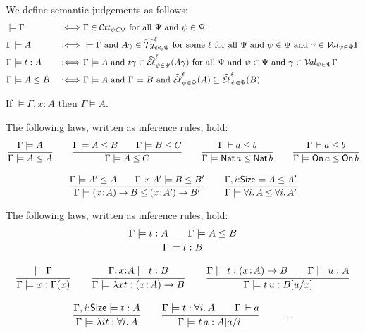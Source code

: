 \documentclass[acmsmall,screen]{acmart}\settopmatter{}
\renewcommand{\forallT}[2]{\forall #1.\,#2}
\renewcommand{\cext}[3]{#1,#2{:}#3}
\begin{document}
We define semantic judgements as follows:
\begin{align*}
  & \models \Gamma
    & \mathrel{\ :\Longleftrightarrow\ }
    & \Gamma \in \mathcal{C}\kern-0.4ex\mathit{xt}_{\psi\in\Psi} \ \mbox{for all}\  \Psi \ \mbox{and}\  \psi \in \Psi
\\
  & \Gamma \models A
    & \mathrel{\ :\Longleftrightarrow\ }
    & \models \Gamma \ \mbox{and}\ 
      A \gamma \in \widehat{\mathcal{T}\kern-0.4ex\mathit{y}}^{\ell}_{\psi\in\Psi} \ \mbox{for some}\  \ell
      \ \mbox{for all}\  \Psi \ \mbox{and}\  \psi \in \Psi
      \ \mbox{and}\  \gamma \in \mathcal{V}\kern-0.4ex\mathit{al}_{\psi\in\Psi} \Gamma
\\
  & \Gamma \models t : A
    & \mathrel{\ :\Longleftrightarrow\ }
    & \Gamma \models A \ \mbox{and}\ 
      t \gamma \in \widehat{\mathcal{E}\kern-0.2ex\ell}^{\ell}_{\psi\in\Psi}(A \gamma)
      \ \mbox{for all}\  \Psi \ \mbox{and}\  \psi \in \Psi
      \ \mbox{and}\  \gamma \in \mathcal{V}\kern-0.4ex\mathit{al}_{\psi\in\Psi} \Gamma
\\
  & \Gamma \models A \leq B
    & \mathrel{\ :\Longleftrightarrow\ }
    & \Gamma \models A \ \mbox{and}\  \Gamma \models B \ \mbox{and}\ 
      \widehat{\mathcal{E}\kern-0.2ex\ell}^{\ell}_{\psi\in\Psi}(A) \subseteq \widehat{\mathcal{E}\kern-0.2ex\ell}^{\ell}_{\psi\in\Psi}(B)
\end{align*}
\begin{lemma}
  If\/ $\models \cext \Gamma x A$ then $\Gamma \models A$.
\end{lemma}
\begin{lemma}
  The following laws, written as inference rules, hold:
\begin{gather*}
  \ru{\Gamma \models A
    }{\Gamma \models A \leq A}
\qquad
  \ru{\Gamma \models A \leq B \qquad
      \Gamma \models B \leq C
    }{\Gamma \models A \leq C}
\qquad
  \ru{\Gamma \der a \leq b
    }{\Gamma \models \Nat a \leq \Nat b}
\qquad
  \ru{\Gamma \der a \leq b
    }{\Gamma \models \On a \leq \On b}
\\[2ex]
  \ru{\Gamma \models A' \leq A \qquad
      \cext \Gamma x {A'} \models B \leq B'
    }{\Gamma \models \funT x A B \leq \funT x {A'} {B'}}
\qquad
  \ru{\cext \Gamma i \Size \models A \leq A'
    }{\Gamma \models \forallT i A \leq \forallT i {A'}}
  \end{gather*}
\end{lemma}
\begin{theorem}
  The following laws, written as inference rules, hold:
\begin{gather*}
  \ru{\Gamma \models t : A \qquad
      \Gamma \models A \leq B
    }{\Gamma \models t : B}
\\[2ex]
  \ru{\models \Gamma
    }{\Gamma \models x : \Gamma(x)}
\qquad
  \ru{\cext \Gamma x A \models t : B
    }{\Gamma \models \lambda x t : \funT x A B}
\qquad
  \ru{\Gamma \models t : \funT x A B \qquad
      \Gamma \models u : A
    }{\Gamma \models t\,u : \subst u x B}
\\[2ex]
  \ru{\cext \Gamma i \Size \models t : A
    }{\Gamma \models \lambda i t : \forallT i A}
\qquad
  \ru{\Gamma \models t : \forallT i A \qquad
      \Gamma \der a
    }{\Gamma \models t\,a : \subst a i A}
\qquad
  \dots
\end{gather*}
\end{theorem}
\end{document}
